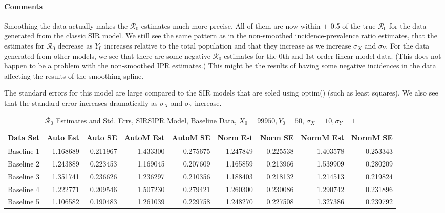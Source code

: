\documentclass[12pt]{article}
\newcommand{\rr}{\ensuremath{\mathcal{R}_0}}
\begin{document}
\paragraph{Comments}

Smoothing the data actually makes the $\rr$ estimates much more precise. All of them are now within $\pm$ 0.5 of the true $\rr$ for the data generated from the classic SIR model. We still see the same pattern as in the non-smoothed incidence-prevalence ratio estimates, that the estimates for $\rr$ decrease as $Y_0$ increases relative to the total population and that they increase as we increase $\sigma_X$ and $\sigma_Y$. For the data generated from other models, we see that there are some negative $\rr$ estimates for the 0th and 1st order linear model data. (This does not happen to be a problem with the non-smoothed IPR estimates.) This might be the results of having some negative incidences in the data affecting the results of the smoothing spline. 

The standard errors for this model are large compared to the SIR models that are soled using optim() (such as least squares). We also see that the standard error increases dramatically as $\sigma_X$ and $\sigma_Y$ increase. 

\begin{table}[H]
	
	\caption{$\rr$ Estimates and Std. Errs, SIRSIPR Model,
		Baseline Data, $X_0 = 99950, Y_0 = 50$, 
		$\sigma_X = 10, \sigma_Y = 1$}
	\begin{footnotesize}
		\hskip -1cm
		\begin{tabular}{l|r|r|r|r|r|r|r|r}
			\hline
			Data Set & Auto Est & Auto SE & AutoM Est & AutoM SE & Norm Est & Norm SE & NormM Est & NormM SE\\
			\hline
			Baseline 1 & 1.168689 & 0.211967 & 1.433300 & 0.275675 & 1.247849 & 0.225538 & 1.403578 & 0.253343\\
			\hline
			Baseline 2 & 1.243889 & 0.223453 & 1.169045 & 0.207609 & 1.165859 & 0.213966 & 1.539909 & 0.280209\\
			\hline
			Baseline 3 & 1.351741 & 0.236626 & 1.236297 & 0.210356 & 1.188403 & 0.218132 & 1.214513 & 0.219824\\
			\hline
			Baseline 4 & 1.222771 & 0.209546 & 1.507230 & 0.279421 & 1.260300 & 0.230086 & 1.290742 & 0.231896\\
			\hline
			Baseline 5 & 1.106582 & 0.190483 & 1.261039 & 0.229758 & 1.248270 & 0.227508 & 1.327386 & 0.239792\\
			\hline
		\end{tabular}
	\end{footnotesize}
\end{table}
\end{document}
